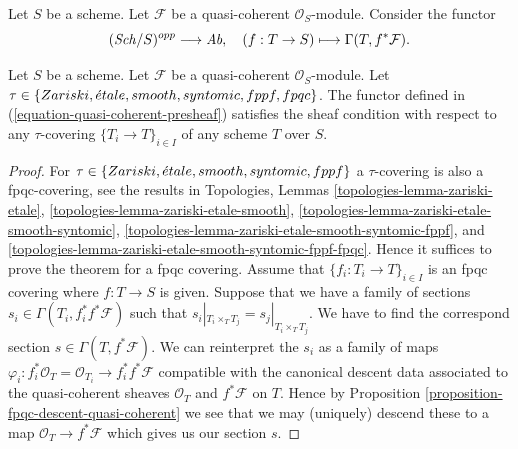 \medskip\noindent
Let $S$ be a scheme.
Let $\mathcal{F}$ be a quasi-coherent $\mathcal{O}_S$-module.
Consider the functor
\begin{equation}
\label{equation-quasi-coherent-presheaf}
(\mathit{Sch}/S)^{opp} \longrightarrow \textit{Ab},
\quad
(f : T \to S) \longmapsto \Gamma(T, f^*\mathcal{F}).
\end{equation}

\begin{lemma}
\label{lemma-sheaf-condition-holds}
Let $S$ be a scheme.
Let $\mathcal{F}$ be a quasi-coherent $\mathcal{O}_S$-module.
Let $\tau \in \{Zariski, \linebreak[0] \etale, \linebreak[0] smooth,
\linebreak[0] syntomic, \linebreak[0] fppf, \linebreak[0] fpqc\}$.
The functor defined in (\ref{equation-quasi-coherent-presheaf})
satisfies the sheaf condition with respect to any $\tau$-covering
$\{T_i \to T\}_{i \in I}$ of any scheme $T$ over $S$.
\end{lemma}

\begin{proof}
For $\tau \in \{Zariski, \linebreak[0] \etale, \linebreak[0] smooth,
\linebreak[0] syntomic, \linebreak[0] fppf\}$ a $\tau$-covering
is also a fpqc-covering, see the results in
Topologies, Lemmas
\ref{topologies-lemma-zariski-etale},
\ref{topologies-lemma-zariski-etale-smooth},
\ref{topologies-lemma-zariski-etale-smooth-syntomic},
\ref{topologies-lemma-zariski-etale-smooth-syntomic-fppf}, and
\ref{topologies-lemma-zariski-etale-smooth-syntomic-fppf-fpqc}.
Hence it suffices to prove the theorem
for a fpqc covering. Assume that $\{f_i : T_i \to T\}_{i \in I}$
is an fpqc covering where $f : T \to S$ is given. Suppose that
we have a family of sections $s_i \in \Gamma(T_i , f_i^*f^*\mathcal{F})$
such that $s_i|_{T_i \times_T T_j} = s_j|_{T_i \times_T T_j}$.
We have to find the correspond section $s \in \Gamma(T, f^*\mathcal{F})$.
We can reinterpret the $s_i$ as a family of maps
$\varphi_i : f_i^*\mathcal{O}_T = \mathcal{O}_{T_i} \to f_i^*f^*\mathcal{F}$
compatible with the canonical descent data associated to the
quasi-coherent sheaves $\mathcal{O}_T$ and $f^*\mathcal{F}$ on $T$.
Hence by Proposition \ref{proposition-fpqc-descent-quasi-coherent}
we see that we may (uniquely) descend
these to a map $\mathcal{O}_T \to f^*\mathcal{F}$ which gives
us our section $s$.
\end{proof}

